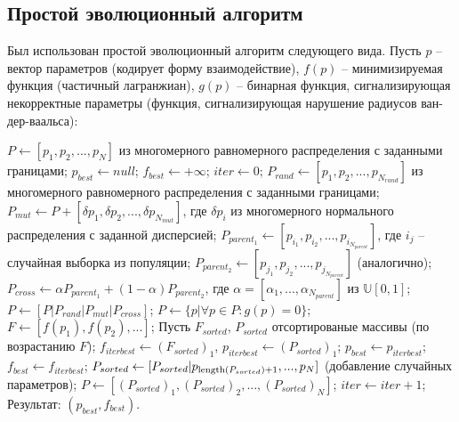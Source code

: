 \subsection{Простой эволюционный алгоритм}
Был использован простой эволюционный алгоритм следующего вида. Пусть $p$ -- вектор параметров (кодирует форму взаимодействие), $f(p)$ -- минимизируемая функция (частичный лагранжиан),
$g(p)$ -- бинарная функция, сигнализирующая некорректные параметры (функция, сигнализирующая нарушение радиусов ван-дер-ваальса):
\begin{algorithm}
\begin{algorithmic}
\State $P \gets [p_1, p_2, ..., p_N]$ из многомерного равномерного распределения с заданными границами;
\State $p_{best} \gets null$;
\State $f_{best} \gets +\infty$;
\State $iter \gets 0$;
	\State $P_{rand} \gets [p_1, p_2, ..., p_{N_{rand}}]$ из многомерного равномерного распределения с заданными границами;
	\State $P_{mut} \gets P + [\delta{}p_1, \delta{}p_2, ..., \delta{}p_{N_{mut}}]$, где $\delta{}p_i$ из многомерного нормального распределения с заданной дисперсией;
	\State $P_{parent_1} \gets [p_{i_1}, p_{i_2}, ..., p_{i_{N_{parent}}}]$, где $i_j$ -- случайная выборка из популяции;
	\State $P_{parent_2} \gets [p_{j_1}, p_{j_2}, ..., p_{j_{N_{parent}}}]$ (аналогично);
	\State $P_{cross} \gets \alpha P_{parent_1} + (1 - \alpha)P_{parent_2}$, где $\alpha = [\alpha_1, ..., \alpha_{N_{parent}}]$ из $\mathbb{U}[0, 1]$;
	\State $P \gets [P | P_{rand} | P_{mut} | P_{cross}]$;
	\State $P \gets \{p | \forall p \in P: g(p) = 0\}$;
	\State $F \gets [f(p_1), f(p_2), ...]$;
	\State Пусть $F_{sorted}$, $P_{sorted}$ отсортированые массивы (по возрастанию $F$);
	\State $f_{iterbest} \gets (F_{sorted})_1$, $p_{iterbest} \gets (P_{sorted})_1$;
		\State $p_{best} \gets p_{iterbest}$;
		\State $f_{best} \gets f_{iterbest}$;
	\EndIf
		\State $P_{sorted} \gets [P_{sorted} | p_{\operatorname{length}(P_{sorted})+1}, ..., p_N]$ (добавление случайных параметров); 
	\EndIf
	\State $P \gets [(P_{sorted})_1, (P_{sorted})_2, ..., (P_{sorted})_N]$;
	\State $iter \gets iter+1$;
\EndWhile
\State Результат: $(p_{best}, f_{best})$.
\end{algorithmic}
\end{algorithm}

